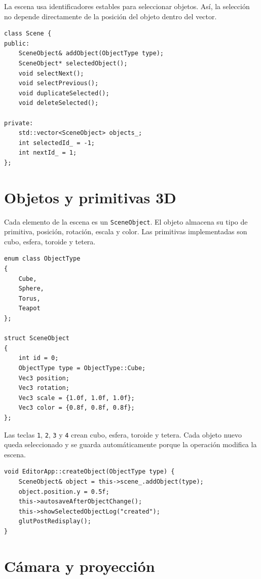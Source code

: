 \documentclass[a4paper,12pt]{article}
\begin{document}
La escena usa identificadores estables para seleccionar objetos. Así, la selección no depende directamente de la posición del objeto dentro del vector.

\begin{lstlisting}
class Scene {
public:
    SceneObject& addObject(ObjectType type);
    SceneObject* selectedObject();
    void selectNext();
    void selectPrevious();
    void duplicateSelected();
    void deleteSelected();

private:
    std::vector<SceneObject> objects_;
    int selectedId_ = -1;
    int nextId_ = 1;
};
\end{lstlisting}

\section{Objetos y primitivas 3D}

Cada elemento de la escena es un \texttt{SceneObject}. El objeto almacena su tipo de primitiva, posición, rotación, escala y color. Las primitivas implementadas son cubo, esfera, toroide y tetera.


\begin{lstlisting}
enum class ObjectType
{
    Cube,
    Sphere,
    Torus,
    Teapot
};

struct SceneObject
{
    int id = 0;
    ObjectType type = ObjectType::Cube;
    Vec3 position;
    Vec3 rotation;
    Vec3 scale = {1.0f, 1.0f, 1.0f};
    Vec3 color = {0.8f, 0.8f, 0.8f};
};
\end{lstlisting}

Las teclas \texttt{1}, \texttt{2}, \texttt{3} y \texttt{4} crean cubo, esfera, toroide y tetera. Cada objeto nuevo queda seleccionado y se guarda automáticamente porque la operación modifica la escena.

\begin{lstlisting}
void EditorApp::createObject(ObjectType type) {
    SceneObject& object = this->scene_.addObject(type);
    object.position.y = 0.5f;
    this->autosaveAfterObjectChange();
    this->showSelectedObjectLog("created");
    glutPostRedisplay();
}
\end{lstlisting}

\section{Cámara y proyección}
\end{document}
